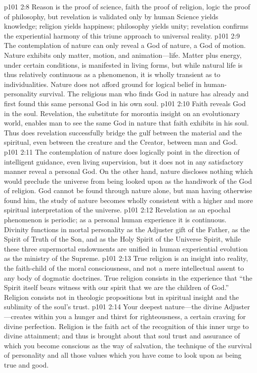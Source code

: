 \pc \vs p101 2:8 Reason is the proof of science, faith the proof of religion, logic the proof of philosophy, but revelation is validated only by human  Science yields knowledge; religion yields happiness; philosophy yields unity; revelation confirms the experiential harmony of this triune approach to universal reality.
\vs p101 2:9 The contemplation of nature can only reveal a God of nature, a God of motion. Nature exhibits only matter, motion, and animation---life. Matter plus energy, under certain conditions, is manifested in living forms, but while natural life is thus relatively continuous as a phenomenon, it is wholly transient as to individualities. Nature does not afford ground for logical belief in human\hyp{}personality survival. The religious man who finds God in nature has already and first found this same personal God in his own soul.
\pc \vs p101 2:10 Faith reveals God in the soul. Revelation, the substitute for morontia insight on an evolutionary world, enables man to see the same God in nature that faith exhibits in his soul. Thus does revelation successfully bridge the gulf between the material and the spiritual, even between the creature and the Creator, between man and God.
\vs p101 2:11 The contemplation of nature does logically point in the direction of intelligent guidance, even living supervision, but it does not in any satisfactory manner reveal a personal God. On the other hand, nature discloses nothing which would preclude the universe from being looked upon as the handiwork of the God of religion. God cannot be found through nature alone, but man having otherwise found him, the study of nature becomes wholly consistent with a higher and more spiritual interpretation of the universe.
\pc \vs p101 2:12 Revelation as an epochal phenomenon is periodic; as a personal human experience it is continuous. Divinity functions in mortal personality as the Adjuster gift of the Father, as the Spirit of Truth of the Son, and as the Holy Spirit of the Universe Spirit, while these three supermortal endowments are unified in human experiential evolution as the ministry of the Supreme.
\vs p101 2:13 True religion is an insight into reality, the faith\hyp{}child of the moral consciousness, and not a mere intellectual assent to any body of dogmatic doctrines. True religion consists in the experience that “the Spirit itself bears witness with our spirit that we are the children of God.” Religion consists not in theologic propositions but in spiritual insight and the sublimity of the soul’s trust.
\vs p101 2:14 Your deepest nature---the divine Adjust\-er---creates within you a hunger and thirst for righteousness, a certain craving for divine perfection. Religion is the faith act of the recognition of this inner urge to divine at\-tain\-ment; and thus is brought about that soul trust and assurance of which you become conscious as the way of salvation, the technique of the survival of personality and all those values which you have come to look upon as being true and good.
